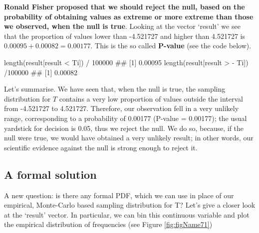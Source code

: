 \documentclass[a4paper,12pt,oneside]{book}
\newenvironment{Shaded}{\begin{snugshade}}{\end{snugshade}}
\newcommand{\DecValTok}[1]{#1}
\newcommand{\SpecialCharTok}[1]{#1}
\newcommand{\DocumentationTok}[1]{#1}
\newcommand{\FunctionTok}[1]{#1}
\newcommand{\NormalTok}[1]{#1}
\begin{document}
\textbf{Ronald Fisher proposed that we should reject the null, based on the probability of obtaining values as extreme or more extreme than those we observed, when the null is true}. Looking at the vector `result' we see that the proportion of values lower than -4.521727 and higher than 4.521727 is \(0.00095 + 0.00082 = 0.00177\). This is the so called \textbf{P-value} (see the code below).

\begin{Shaded}
\begin{Highlighting}[]
\FunctionTok{length}\NormalTok{(result[result }\SpecialCharTok{\textless{}}\NormalTok{ Ti]) }\SpecialCharTok{/} \DecValTok{100000}
\DocumentationTok{\#\# [1] 0.00095}
\FunctionTok{length}\NormalTok{(result[result }\SpecialCharTok{\textgreater{}} \SpecialCharTok{{-}}\NormalTok{ Ti]) }\SpecialCharTok{/}\DecValTok{100000}
\DocumentationTok{\#\# [1] 0.00082}
\end{Highlighting}
\end{Shaded}

Let's summarise. We have seen that, when the null is true, the sampling distribution for \(T\) contains a very low proportion of values outside the interval from -4.521727 to 4.521727. Therefore, our observation fell in a very unlikely range, corresponding to a probability of 0.00177 (P-value = 0.00177); the usual yardstick for decision is 0.05, thus we reject the null. We do so, because, if the null were true, we would have obtained a very unlikely result; in other words, our scientific evidence against the null is strong enough to reject it.

\hypertarget{a-formal-solution}{%
\subsection{A formal solution}\label{a-formal-solution}}

A new question: is there any formal PDF, which we can use in place of our empirical, Monte-Carlo based sampling distribution for T? Let's give a closer look at the `result' vector. In particular, we can bin this continuous variable and plot the empirical distribution of frequencies (see Figure \ref{fig:figName71})
\end{document}
